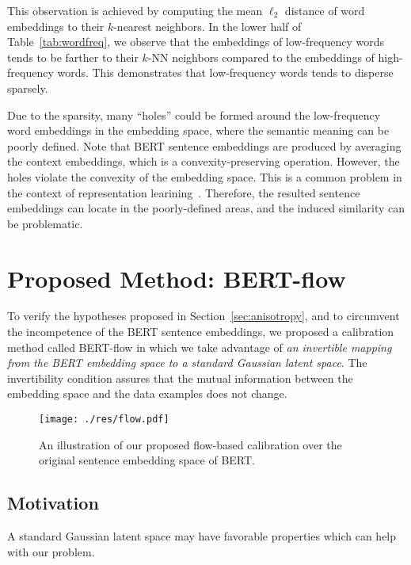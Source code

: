 \documentclass[11pt,a4paper]{article}
\begin{document}
This observation is achieved by computing the mean $\ell_2$ distance of word embeddings to their $k$-nearest neighbors. In the lower half of Table~\ref{tab:wordfreq}, we observe that the embeddings of low-frequency words tends to be farther to their $k$-NN neighbors compared to the embeddings of high-frequency words. This demonstrates that low-frequency words tends to disperse sparsely. 

Due to the sparsity, many ``holes'' could be formed around the low-frequency word embeddings in the embedding space, where the semantic meaning can be poorly defined. Note that BERT sentence embeddings are produced by averaging the context embeddings, which is a convexity-preserving operation. However, the holes violate the convexity of the embedding space. This is a common problem in the context of representation learining~\citep{rezende2018taming,li2019surprisingly,ghosh2019variational}. Therefore, the resulted sentence embeddings can locate in the poorly-defined areas, and the induced  similarity can be problematic.








 

\section{Proposed Method: BERT-flow}
To verify the hypotheses proposed in Section~\ref{sec:anisotropy}, and to circumvent the incompetence of the BERT sentence embeddings, we proposed a calibration method called BERT-flow in which we take advantage of \textit{an invertible mapping from the BERT embedding space to a standard Gaussian latent space}. The invertibility condition assures that the mutual information between the embedding space and the data examples does not change. 

\begin{figure}[!t]
	\centering
	\texttt{[image: ./res/flow.pdf]}
	\vspace{-20pt}
	\caption{\label{fig:flow} An illustration of our proposed flow-based calibration over the original sentence embedding space of BERT. }
	\vspace{-10pt}
\end{figure}

\subsection{Motivation}
A standard Gaussian latent space may have favorable properties which can help with our problem. 
\end{document}
